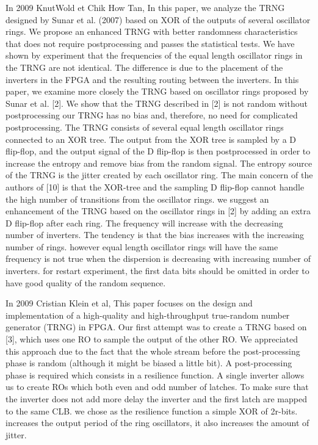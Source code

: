 In 2009 KnutWold et Chik How Tan, In this paper, we analyze the TRNG designed by Sunar et al. (2007) based on XOR of the outputs of several oscillator rings. We propose an enhanced TRNG with better randomness characteristics that does not require postprocessing and passes the statistical tests. We have shown by experiment that the frequencies of the equal length oscillator rings in the TRNG are not identical. The difference is due to the placement of the inverters in the FPGA and the resulting routing between the inverters. In this paper, we examine more closely the TRNG based on oscillator rings proposed by Sunar et al. [2]. We show that the TRNG described in [2] is not random without postprocessing our TRNG has no bias and, therefore, no need for complicated postprocessing. The TRNG consists of several equal length oscillator rings connected to an XOR tree. The output from the XOR tree is sampled by a D flip-flop, and the output signal of the D flip-flop is then postprocessed in order to increase the entropy and remove bias from the random signal. The entropy source of the TRNG is the jitter created by each oscillator ring. The main concern of the authors of [10] is that the XOR-tree and the sampling D flip-flop cannot handle the high number of transitions from the oscillator rings. we suggest an enhancement of the TRNG based on the oscillator rings in [2] by adding an extra D flip-flop after each ring. The frequency will increase with the decreasing number of inverters. The tendency is that the bias increases with the increasing number of rings. however equal length oscillator rings will have the same frequency is not true when the dispersion is decreasing with increasing number of inverters. for restart experiment, the first data bits should be omitted in order to have good quality of the random sequence.

In 2009 Cristian Klein et al, This paper focuses on the design and implementation of a high-quality and high-throughput true-random number generator (TRNG) in FPGA. Our first attempt was to create a TRNG based on [3], which uses one RO to sample the output of the other RO. We appreciated this approach due to the fact that the whole stream before the post-processing phase is random (although it might be biased a little bit). A post-processing phase is required which consists in a resilience function. A single inverter allows us to create ROs which both even and odd number of latches. To make sure that the inverter does not add more delay the inverter and the first latch are mapped to the same CLB. we chose as the resilience function a simple XOR of 2r-bits. increases the output period of the ring oscillators, it also increases the amount of jitter. 

